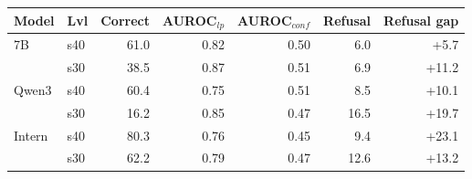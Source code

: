 \begin{tabular}{@{}llrrrrr@{}}
\toprule
Model & Lvl & Correct & AUROC$_{lp}$ & AUROC$_{conf}$ & Refusal & Refusal gap \\
\midrule
7B & s40 & 61.0 & 0.82 & 0.50 & 6.0 & +5.7 \\
 & s30 & 38.5 & 0.87 & 0.51 & 6.9 & +11.2 \\
Qwen3 & s40 & 60.4 & 0.75 & 0.51 & 8.5 & +10.1 \\
 & s30 & 16.2 & 0.85 & 0.47 & 16.5 & +19.7 \\
Intern & s40 & 80.3 & 0.76 & 0.45 & 9.4 & +23.1 \\
 & s30 & 62.2 & 0.79 & 0.47 & 12.6 & +13.2 \\
\bottomrule
\end{tabular}
